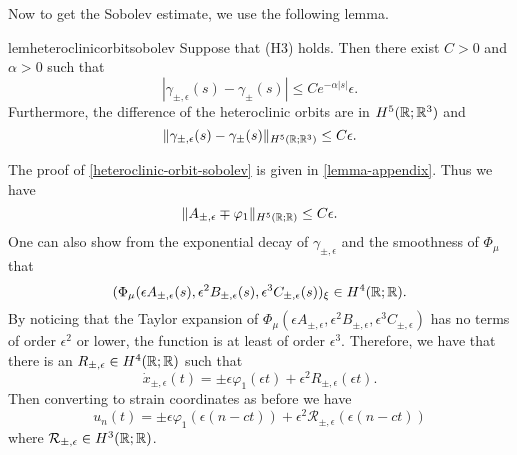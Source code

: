 Now to get the Sobolev estimate, we use the following lemma.
\begin{restatable}{lem}{heteroclinicorbitsobolev}\label{heteroclinic-orbit-sobolev}
	Suppose that (H3) holds. Then there exist \(C> 0\) and \(\alpha > 0\) such that
	\begin{equation*}
		| \gamma_{\pm, \epsilon}(s) - \gamma_{\pm}(s) | \leq C e^{-\alpha| s|} \epsilon.
	\end{equation*}
	Furthermore, the difference of the heteroclinic orbits are in \(H^5(\mathbb{R}; \mathbb{R}^3)\) and 
	\begin{equation*}
		\| \gamma_{\pm, \epsilon}(s) - \gamma_{\pm}(s) \|_{H^5(\mathbb{R};\mathbb{R}^3)}  \leq C \epsilon.
	\end{equation*}
\end{restatable}
The proof of \cref{heteroclinic-orbit-sobolev} is given in \cref{lemma-appendix}. Thus we have
\begin{equation*}
	\|A_{\pm, \epsilon} \mp \varphi_{1}\|_{H^5(\mathbb{R};\mathbb{R})} \leq C \epsilon.
\end{equation*}
One can also show from the exponential decay of \(\gamma_{\pm, \epsilon}\) and the smoothness of \(\Phi_\mu\) that
\begin{equation*}
	(\Phi_\mu(\epsilon A_{\pm, \epsilon}(s),\epsilon^2 B_{\pm, \epsilon}(s) ,\epsilon^3 C_{\pm, \epsilon}(s))_\xi \in H^4(\mathbb{R};\mathbb{R}).
\end{equation*}
By noticing that the Taylor expansion of \(\Phi_\mu(\epsilon A_{\pm, \epsilon}, \epsilon^2 B_{\pm, \epsilon}, \epsilon^3 C_{\pm, \epsilon})\) has no terms of order \(\epsilon^2\) or lower, the function is at least of order \(\epsilon^3\). Therefore, we have that there is an \(R_{\pm,\epsilon} \in H^4(\mathbb{R};\mathbb{R})\) such that
\begin{equation*}
	\dot x_{\pm, \epsilon }(t) = \pm \epsilon\varphi_1(\epsilon t) + \epsilon^2 R_{\pm,\epsilon}(\epsilon t).
\end{equation*}
Then converting to strain coordinates as before we have
\begin{equation*}
	u_n(t) = \pm\epsilon\varphi_1(\epsilon(n-ct)) + \epsilon^2 \mathcal R_{\pm, \epsilon}(\epsilon(n-ct))
\end{equation*}
where \(\mathcal R_{\pm, \epsilon} \in H^3(\mathbb{R};\mathbb{R})\).

